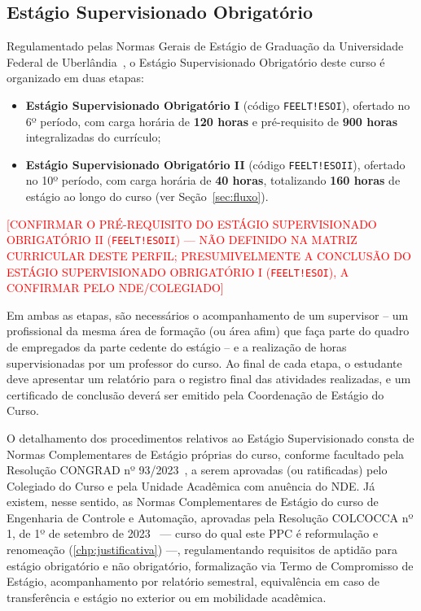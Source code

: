 \subsection{Estágio Supervisionado Obrigatório}

Regulamentado pelas Normas Gerais de Estágio de Graduação da Universidade Federal de Uberlândia~\cite{ufu_congrad_93_2023}, o Estágio Supervisionado Obrigatório deste curso é organizado em duas etapas:

\begin{itemize}
    \item \textbf{Estágio Supervisionado Obrigatório I} (código \texttt{FEELT!ESOI}), ofertado no 6º período, com carga horária de \textbf{120 horas} e pré-requisito de \textbf{900 horas} integralizadas do currículo;
    \item \textbf{Estágio Supervisionado Obrigatório II} (código \texttt{FEELT!ESOII}), ofertado no 10º período, com carga horária de \textbf{40 horas}, totalizando \textbf{160 horas} de estágio ao longo do curso (ver Seção~\ref{sec:fluxo}).
\end{itemize}

\textcolor{red}{[CONFIRMAR O PRÉ-REQUISITO DO ESTÁGIO SUPERVISIONADO OBRIGATÓRIO II (\texttt{FEELT!ESOII}) — NÃO DEFINIDO NA MATRIZ CURRICULAR DESTE PERFIL; PRESUMIVELMENTE A CONCLUSÃO DO ESTÁGIO SUPERVISIONADO OBRIGATÓRIO I (\texttt{FEELT!ESOI}), A CONFIRMAR PELO NDE/COLEGIADO]}

Em ambas as etapas, são necessários o acompanhamento de um supervisor -- um profissional da mesma área de formação (ou área afim) que faça parte do quadro de empregados da parte cedente do estágio -- e a realização de horas supervisionadas por um professor do curso. Ao final de cada etapa, o estudante deve apresentar um relatório para o registro final das atividades realizadas, e um certificado de conclusão deverá ser emitido pela Coordenação de Estágio do Curso.

O detalhamento dos procedimentos relativos ao Estágio Supervisionado consta de Normas Complementares de Estágio próprias do curso, conforme facultado pela Resolução CONGRAD nº 93/2023~\cite{ufu_congrad_93_2023}, a serem aprovadas (ou ratificadas) pelo Colegiado do Curso e pela Unidade Acadêmica com anuência do NDE. Já existem, nesse sentido, as Normas Complementares de Estágio do curso de Engenharia de Controle e Automação, aprovadas pela Resolução COLCOCCA nº 1, de 1º de setembro de 2023~\cite{ufu_colcocca_1_2023} — curso do qual este PPC é reformulação e renomeação (\autoref{chp:justificativa}) —, regulamentando requisitos de aptidão para estágio obrigatório e não obrigatório, formalização via Termo de Compromisso de Estágio, acompanhamento por relatório semestral, equivalência em caso de transferência e estágio no exterior ou em mobilidade acadêmica.

